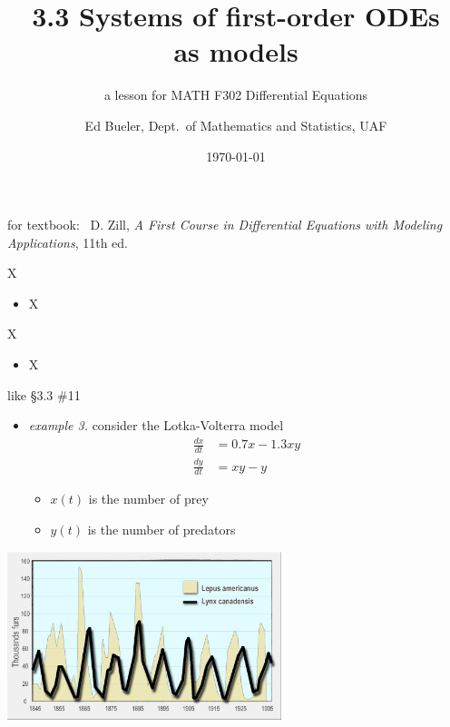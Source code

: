 \documentclass[urlcolor=blue,dvipsnames]{beamer}
\title{3.3 Systems of first-order ODEs \\ as models}
\subtitle{a lesson for MATH F302 Differential Equations}
\author{Ed Bueler, Dept.~of Mathematics and Statistics, UAF}
\date{\tiny \today}
\begin{document}
\renewcommand{\thefootnote}{{\color{green} \arabic{footnote}}}

\begin{frame}
\titlepage

\centerline{\tiny for textbook: \, D. Zill, \emph{A First Course in Differential Equations with Modeling Applications}, 11th ed.}
\end{frame}

\newcommand{\LL}[1]{\mathcal{L}\left\{#1\right\}}
\newcommand{\LLi}[1]{\mathcal{L}^{-1}\left\{#1\right\}}


\begin{frame}{X}

\begin{itemize}
\item X
\end{itemize}
\end{frame}


\begin{frame}{X}

\begin{itemize}
\item X
\end{itemize}
\end{frame}


\begin{frame}{like \S3.3 \#11}

\begin{itemize}
\item \emph{example 3.}  consider the Lotka-Volterra model
\begin{align*}
\frac{dx}{dt} &= 0.7 x - 1.3 xy \\
\frac{dy}{dt} &= xy - y
\end{align*}

\vspace{-2mm}
    \begin{itemize}
    \item $x(t)$ is the number of prey
    \item $y(t)$ is the number of predators
    \end{itemize}
\end{itemize}

\bigskip
\hfill \includegraphics[width=0.6\textwidth]{figs/hares-lynx}
\end{frame}
\end{document}
